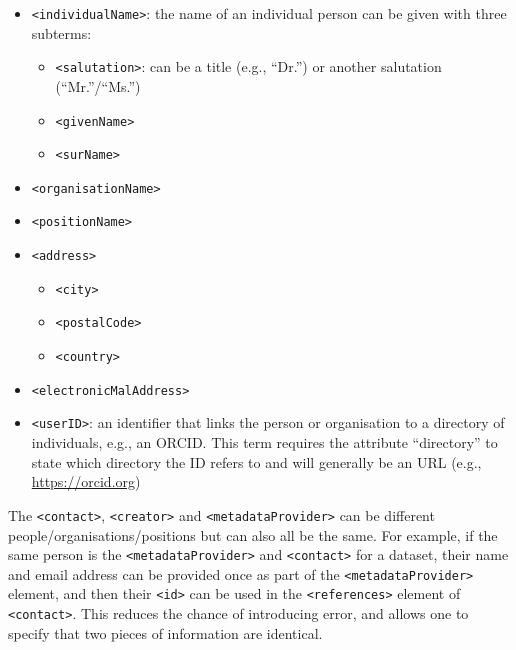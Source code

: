 \documentclass[
  oneside]{book}
\providecommand{\tightlist}{%
  \setlength{\itemsep}{0pt}\setlength{\parskip}{0pt}}
\begin{document}
\begin{itemize}
\item
  \texttt{\textless{}individualName\textgreater{}}: the name of an individual person can be given with three subterms:

  \begin{itemize}
  \tightlist
  \item
    \texttt{\textless{}salutation\textgreater{}}: can be a title (e.g., ``Dr.'') or another salutation (``Mr.''/``Ms.'')
  \item
    \texttt{\textless{}givenName\textgreater{}}
  \item
    \texttt{\textless{}surName\textgreater{}}
  \end{itemize}
\item
  \texttt{\textless{}organisationName\textgreater{}}
\item
  \texttt{\textless{}positionName\textgreater{}}
\item
  \texttt{\textless{}address\textgreater{}}

  \begin{itemize}
  \tightlist
  \item
    \texttt{\textless{}city\textgreater{}}
  \item
    \texttt{\textless{}postalCode\textgreater{}}
  \item
    \texttt{\textless{}country\textgreater{}}
  \end{itemize}
\item
  \texttt{\textless{}electronicMalAddress\textgreater{}}
\item
  \texttt{\textless{}userID\textgreater{}}: an identifier that links the person or organisation to a directory of individuals, e.g., an ORCID. This term requires the attribute ``directory'' to state which directory the ID refers to and will generally be an URL (e.g., \url{https://orcid.org})
\end{itemize}

The \texttt{\textless{}contact\textgreater{}}, \texttt{\textless{}creator\textgreater{}} and \texttt{\textless{}metadataProvider\textgreater{}} can be different people/organisations/positions but can also all be the same. For example, if the same person is the \texttt{\textless{}metadataProvider\textgreater{}} and \texttt{\textless{}contact\textgreater{}} for a dataset, their name and email address can be provided once as part of the \texttt{\textless{}metadataProvider\textgreater{}} element, and then their \texttt{\textless{}id\textgreater{}} can be used in the \texttt{\textless{}references\textgreater{}} element of \texttt{\textless{}contact\textgreater{}}. This reduces the chance of introducing error, and allows one to specify that two pieces of information are identical.
\end{document}
